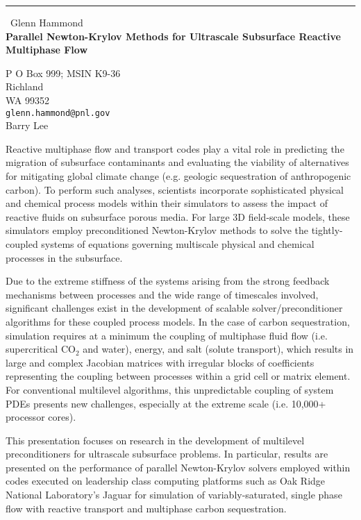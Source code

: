 \documentclass{report}
\begin{document}
\begin{center}
\rule{6in}{1pt} \
{\large Glenn Hammond \\
{\bf Parallel Newton-Krylov Methods for Ultrascale Subsurface Reactive Multiphase Flow}}

P O Box 999; MSIN K9-36 \\ Richland \\ WA 99352
\\
{\tt glenn.hammond@pnl.gov}\\
Barry Lee\end{center}

Reactive multiphase flow and transport codes play a vital role in
predicting the migration of subsurface contaminants and evaluating the
viability of alternatives for mitigating global climate change (e.g.
geologic sequestration of anthropogenic carbon). To perform such
analyses, scientists incorporate sophisticated physical and chemical
process models within their simulators to assess the impact of reactive
fluids on subsurface porous media. For large 3D field-scale models, these
simulators employ preconditioned Newton-Krylov methods to solve the
tightly-coupled systems of equations governing multiscale physical and
chemical processes in the subsurface.

Due to the extreme stiffness of the systems arising from the strong
feedback mechanisms between processes and the wide range of timescales
involved, significant challenges exist in the development of scalable
solver/preconditioner algorithms for these coupled process models. In the
case of carbon sequestration, simulation requires at a minimum the
coupling of multiphase fluid flow (i.e. supercritical CO$_2$ and water),
energy, and salt (solute transport), which results in large and complex
Jacobian matrices with irregular blocks of coefficients representing the
coupling between processes within a grid cell or matrix element. For
conventional multilevel algorithms, this unpredictable coupling of system
PDEs presents new challenges, especially at the extreme scale (i.e.
10,000+ processor cores).

This presentation focuses on research in the development of multilevel
preconditioners for ultrascale subsurface problems. In particular,
results are presented on the performance of parallel Newton-Krylov
solvers employed within codes executed on leadership class computing
platforms such as Oak Ridge National Laboratory's Jaguar for simulation
of variably-saturated, single phase flow with reactive transport and
multiphase carbon sequestration.
\end{document}
